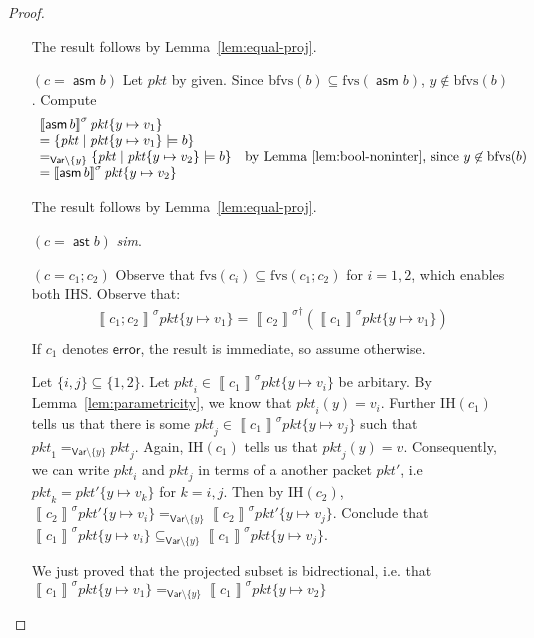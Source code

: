 \documentclass{article}
\newcommand{\pkt}{\mathit{pkt}}
\newcommand{\error}{\mathsf{error}}
\newcommand{\denote}[1]{\left\llbracket#1\right\rrbracket}
\newcommand{\Var}{\mathsf{Var}}
\newcommand{\assert}{\mathop{\mathsf{ast}}}
\newcommand{\assume}{\mathop{\mathsf{asm}}}
\newcommand{\fvs}{\textrm{fvs}}
\newcommand{\bfvs}{\textrm{bfvs}}
\theoremstyle{plain}
\theoremstyle{definition}
\theoremstyle{remark}
\begin{document}
\begin{proof}
\begin{enumerate}[align=left]
    The result follows by Lemma~\ref{lem:equal-proj}.

  \item[$(c = \assume b)$]
    Let $\pkt$ by given. Since $\bfvs(b) \subseteq \fvs(\assume b)$, $y \not\in \bfvs(b)$.
    Compute \[
    \begin{array}{ll}
      \denote{\assume b}^\sigma \pkt\{y \mapsto v_1\} \\
      = \{\pkt \mid \pkt\{y \mapsto v_1\} \models b\}\\
      =_{\Var \setminus \{y\}} \{\pkt \mid \pkt\{y \mapsto v_2\} \models b\} & \text{by Lemma~\ref{lem:bool-noninter}, since }y \not\in \bfvs(b) \\
      = \denote{\assume b}^\sigma \pkt\{y \mapsto v_2\}
    \end{array}
    \]

    The result follows by Lemma~\ref{lem:equal-proj}.

    \item[$(c = \assert b)$] \textit{sim}.
    \item[$(c = c_1;c_2)$] Observe that $\fvs(c_i) \subseteq \fvs(c_1;c_2)$ for
      $i = 1,2$, which enables both IHS. Observe that:
      \[\begin{array}{ll}
      \denote{c_1;c_2}^\sigma\pkt\{y \mapsto v_1\}
      = {\denote{c_2}^\sigma}^\dagger\left(\denote{c_1}^\sigma\pkt\{y\mapsto v_1\}\right) \\
      \end{array}
      \]
      If $c_1$ denotes $\error$, the result is immediate, so assume otherwise.

      Let $\{i,j\} \subseteq \{1,2\}$. Let $\pkt_i \in
      \denote{c_1}^\sigma\pkt\{y \mapsto v_i\}$ be arbitary. By
      Lemma~\ref{lem:parametricity}, we know that $\pkt_i(y) = v_i$. Further
      IH$(c_1)$ tells us that there is some $\pkt_j \in
      \denote{c_1}^\sigma\pkt\{y\mapsto v_j\}$ such that $\pkt_1 =_{\Var
        \setminus \{y\}} \pkt_j$. Again, IH$(c_1)$ tells us that $\pkt_j(y) =
      v$. Consequently, we can write $\pkt_i$ and $\pkt_j$ in terms of a another
      packet $\pkt'$, i.e $\pkt_k = \pkt'\{y \mapsto v_k\}$ for $k = i,j$. Then
      by IH$(c_2)$, $\denote{c_2}^\sigma\pkt'\{y \mapsto v_i\} =_{\Var \setminus \{y\}}
      \denote{c_2}^\sigma \pkt'\{y \mapsto v_j\}$. Conclude that
      $\denote{c_1}^\sigma\pkt\{y \mapsto v_i\} \subseteq_{\Var \setminus \{y\} }
      \denote{c_1}^\sigma\pkt\{y \mapsto v_j\}$.

      We just proved that the projected subset is bidrectional, i.e. that
      $\denote{c_1}^\sigma\pkt\{y \mapsto v_1\} =_{\Var \setminus\{y\}}
      \denote{c_1}^\sigma\pkt\{y \mapsto v_2\}$


\end{enumerate}
\end{proof}
\end{document}
